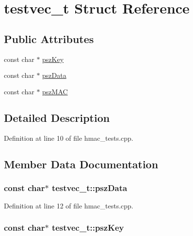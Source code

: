 \hypertarget{structtestvec__t}{}\section{testvec\+\_\+t Struct Reference}
\label{structtestvec__t}
\subsection*{Public Attributes}
\begin{DoxyCompactItemize}
\item 
const char $\ast$ \hyperlink{structtestvec__t_a4983d2e6df282d87a80c12b2dedf07ec}{psz\+Key}
\item 
const char $\ast$ \hyperlink{structtestvec__t_a1f7d5ca3345a90c98071ffa7794778b7}{psz\+Data}
\item 
const char $\ast$ \hyperlink{structtestvec__t_a4ee05132f8873aff7f7bae044eb9dfe2}{psz\+M\+A\+C}
\end{DoxyCompactItemize}


\subsection{Detailed Description}


Definition at line 10 of file hmac\+\_\+tests.\+cpp.



\subsection{Member Data Documentation}
\hypertarget{structtestvec__t_a1f7d5ca3345a90c98071ffa7794778b7}{}
\subsubsection[{psz\+Data}]{\setlength{\rightskip}{0pt plus 5cm}const char$\ast$ testvec\+\_\+t\+::psz\+Data}\label{structtestvec__t_a1f7d5ca3345a90c98071ffa7794778b7}


Definition at line 12 of file hmac\+\_\+tests.\+cpp.

\hypertarget{structtestvec__t_a4983d2e6df282d87a80c12b2dedf07ec}{}
\subsubsection[{psz\+Key}]{\setlength{\rightskip}{0pt plus 5cm}const char$\ast$ testvec\+\_\+t\+::psz\+Key}\label{structtestvec__t_a4983d2e6df282d87a80c12b2dedf07ec}


